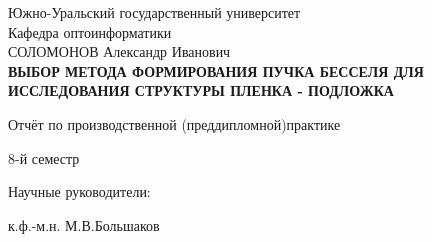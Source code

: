 \begin{titlepage}
\begin{center}
Южно-Уральский государственный университет\\ Кафедра оптоинформатики\\
\vspace{4cm}
СОЛОМОНОВ Александр Иванович\\
\vspace{3cm}
{\bf ВЫБОР МЕТОДА ФОРМИРОВАНИЯ ПУЧКА БЕССЕЛЯ ДЛЯ ИССЛЕДОВАНИЯ СТРУКТУРЫ ПЛЕНКА - ПОДЛОЖКА}

\vspace{2cm}
Отчёт по производственной (преддипломной)практике


8-й семестр\\



\end{center}

\vspace{3cm}

\hspace{8,8cm}Научные руководители: %

\hspace{8,8cm}к.ф.-м.н. М.В.Большаков

\vfill
{}
\end{titlepage}

\thispagestyle{empty}
\clearpage
\tableofcontents
\clearpage
